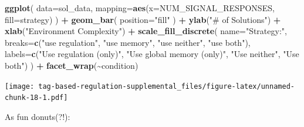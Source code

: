 \documentclass[
]{book}
\newenvironment{Shaded}{\begin{snugshade}}{\end{snugshade}}
\newcommand{\DataTypeTok}[1]{\textcolor[rgb]{0.13,0.29,0.53}{#1}}
\newcommand{\KeywordTok}[1]{\textcolor[rgb]{0.13,0.29,0.53}{\textbf{#1}}}
\newcommand{\NormalTok}[1]{#1}
\newcommand{\OperatorTok}[1]{\textcolor[rgb]{0.81,0.36,0.00}{\textbf{#1}}}
\newcommand{\StringTok}[1]{\textcolor[rgb]{0.31,0.60,0.02}{#1}}
\begin{document}
\begin{Shaded}
\begin{Highlighting}[]
\KeywordTok{ggplot}\NormalTok{( }\DataTypeTok{data=}\NormalTok{sol\_data, }\DataTypeTok{mapping=}\KeywordTok{aes}\NormalTok{(}\DataTypeTok{x=}\NormalTok{NUM\_SIGNAL\_RESPONSES, }\DataTypeTok{fill=}\NormalTok{strategy) ) }\OperatorTok{+}
\StringTok{  }\KeywordTok{geom\_bar}\NormalTok{(}
    \DataTypeTok{position=}\StringTok{"fill"}
\NormalTok{  ) }\OperatorTok{+}
\StringTok{  }\KeywordTok{ylab}\NormalTok{(}\StringTok{"\# of Solutions"}\NormalTok{) }\OperatorTok{+}
\StringTok{  }\KeywordTok{xlab}\NormalTok{(}\StringTok{"Environment Complexity"}\NormalTok{) }\OperatorTok{+}
\StringTok{  }\KeywordTok{scale\_fill\_discrete}\NormalTok{(}
    \DataTypeTok{name=}\StringTok{"Strategy:"}\NormalTok{,}
    \DataTypeTok{breaks=}\KeywordTok{c}\NormalTok{(}\StringTok{"use regulation"}\NormalTok{,}
             \StringTok{"use memory"}\NormalTok{,}
             \StringTok{"use neither"}\NormalTok{,}
             \StringTok{"use both"}\NormalTok{),}
    \DataTypeTok{labels=}\KeywordTok{c}\NormalTok{(}\StringTok{"Use regulation (only)"}\NormalTok{,}
             \StringTok{"Use global memory (only)"}\NormalTok{,}
             \StringTok{"Use neither"}\NormalTok{,}
             \StringTok{"Use both"}\NormalTok{)}
\NormalTok{    ) }\OperatorTok{+}
\StringTok{  }\KeywordTok{facet\_wrap}\NormalTok{(}\OperatorTok{\textasciitilde{}}\NormalTok{condition)}
\end{Highlighting}
\end{Shaded}

\texttt{[image: tag-based-regulation-supplemental\_files/figure-latex/unnamed-chunk-18-1.pdf]}

As fun donuts(?!):
\end{document}

